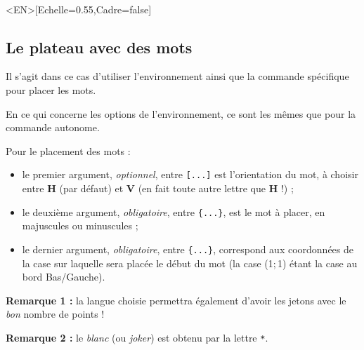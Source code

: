 \documentclass{article}
\newcommand\Cle[1]{{\bfseries\sffamily\textlangle #1\textrangle}}
\begin{document}
\begin{PresentationCode}{}
\PlateauScrabble[Labels=false,Echelle=0.55]\\     %
\PlateauScrabble<EN>[Echelle=0.55,Cadre=false]    %
\end{PresentationCode}

\newpage

\subsection{Le plateau avec des mots}

Il s'agit dans ce cas d'utiliser l'\textsf{environnement} ainsi que la \textsf{commande} spécifique pour placer les mots.

\smallskip

En ce qui concerne les options de l'\textsf{environnement}, ce sont les mêmes que pour la \textsf{commande} autonome.

\smallskip

Pour le placement des mots :

\begin{itemize}
	\item le premier argument, \textit{optionnel}, entre \texttt{[...]} est l'orientation du mot, à choisir entre \Cle{H} (par défaut) et \Cle{V} (en fait toute autre lettre que \Cle{H} !) ;
	\item le deuxième argument, \textit{obligatoire}, entre \texttt{\{...\}}, est le mot à placer, en majuscules ou minuscules ;
	\item le dernier argument, \textit{obligatoire}, entre \texttt{\{...\}}, correspond aux coordonnées de la case sur laquelle sera placée le début du mot (la case (1;\,1) étant la case au bord Bas/Gauche).
\end{itemize}

\textbf{Remarque 1 :} la langue choisie permettra également d'avoir les jetons avec le \textit{bon} nombre de points !

\smallskip

\textbf{Remarque 2 :} le \textit{blanc} (ou \textit{joker}) est obtenu par la lettre \texttt{*}.

\begin{PresentationCode}{}
\begin{EnvScrabbleFR}[Echelle=0.75,Labels=false,Aide]
\end{EnvScrabbleFR}
\end{PresentationCode}
\end{document}
